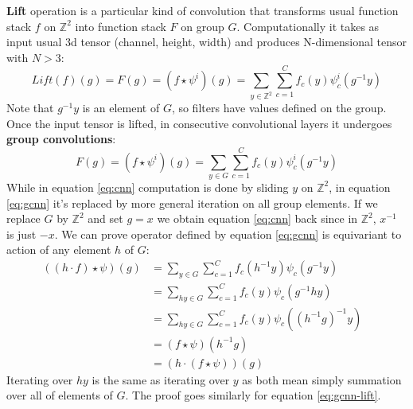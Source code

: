    \textbf{Lift} operation is a particular kind of convolution
    that transforms usual function stack $f$ on $\mathbb{Z}^2$ into
    function stack $F$ on group $G$. Computationally it takes as input
    usual 3d tensor (channel, height, width) and produces
    N-dimensional tensor with $N>3$:
    \begin{equation}
        \label{eq:gcnn-lift}
        \mathit{Lift}(f)(g) = F(g) = (f\star\psi^i)(g) = \sum_{y\in \mathbb{Z}^2}\sum_{c=1}^C
        f_c(y)\psi_{c}^{i}(g^{-1}y)
    \end{equation}
    Note that $g^{-1}y$ is an element of $G$, so filters have values defined on
    the group.
    Once the input tensor is lifted, in consecutive convolutional layers it
    undergoes \textbf{group convolutions}:
    \begin{equation}
        \label{eq:gcnn}
        F(g) = (f\star\psi^i)(g) = \sum_{y\in G}\sum_{c=1}^C
        f_c(y)\psi_{c}^{i}(g^{-1}y)
    \end{equation}
    While in equation \ref{eq:cnn} computation is done by sliding
    $y$ on $\mathbb{Z}^2$, in equation \ref{eq:gcnn} it's replaced by more
    general iteration on all group elements. If we replace $G$ by $\mathbb{Z}^2$
    and set $g=x$ we obtain equation \ref{eq:cnn} back since in $\mathbb{Z}^2$,
    $x^{-1}$ is just $-x$. We can prove operator defined by equation
    \ref{eq:gcnn} is equivariant to action of any element $h$ of $G$:
    \begin{align*}
        ((h\cdot f)\star\psi)(g) & =
        \sum_{y\in G}\sum_{c=1}^C f_c(h^{-1}y)\psi_{c}(g^{-1}y)\\
        & = \sum_{hy\in G}\sum_{c=1}^C f_c(y)\psi_{c}(g^{-1}hy)\\
        & = \sum_{hy\in G}\sum_{c=1}^C f_c(y)\psi_{c}((h^{-1}g)^{-1}y)\\
        & = (f\star\psi)(h^{-1}g) &  \\
        & = (h\cdot(f\star\psi))(g)
    \end{align*}
    Iterating over $hy$ is the same as iterating over $y$ as both mean simply
    summation over all of elements of $G$.
    The proof goes similarly for equation \ref{eq:gcnn-lift}.

